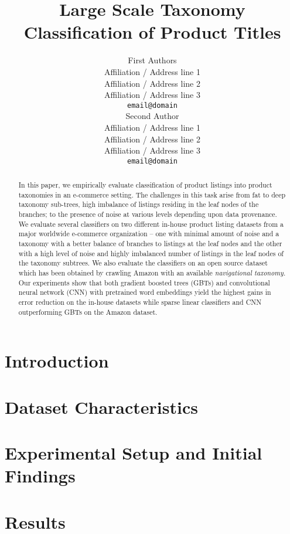 \documentclass[11pt]{article}
\title{Large Scale Taxonomy Classification of Product Titles}
\author{First Authors \\
  Affiliation / Address line 1 \\
  Affiliation / Address line 2 \\
  Affiliation / Address line 3 \\
  {\tt email@domain} \\\And
  Second Author \\
  Affiliation / Address line 1 \\
  Affiliation / Address line 2 \\
  Affiliation / Address line 3 \\
  {\tt email@domain} \\}
\date{}
\begin{document}
\maketitle
\begin{abstract}
In this paper, we empirically evaluate classification of product listings into product taxonomies in an e-commerce setting.
The challenges in this task arise from fat to deep taxonomy sub-trees, high imbalance of listings residing in the leaf nodes of the branches; to the presence of noise at various levels depending upon data provenance.
We evaluate several classifiers on two different in-house product listing datasets from a major worldwide e-commerce organization -- 
one with minimal amount of noise and a taxonomy with a better balance of branches to listings at the leaf nodes and the other with a high level of noise and highly imbalanced number of listings in the leaf nodes of the taxonomy subtrees. 
We also evaluate the classifiers on an open source dataset which has been obtained by crawling Amazon with an available \textit{navigational taxonomy}. 
Our experiments show that both gradient boosted trees (GBTs) and convolutional neural network (CNN) with pretrained word embeddings yield the highest gains in error reduction on the in-house datasets while sparse linear classifiers and CNN outperforming GBTs on the Amazon dataset.

\end{abstract}

\section{Introduction}
\label{Sect:intro}

\vspace{-0.2cm}
\section{Dataset Characteristics}
\label{Sect:dataset}

\vspace{-0.2cm}
\section{Experimental Setup and Initial Findings}
\label{Sect:experimental_setup}

\vspace{-0.2cm}
\section{Results}
\label{Sect:results}

%
\vspace{-0.2cm}
\end{document}
